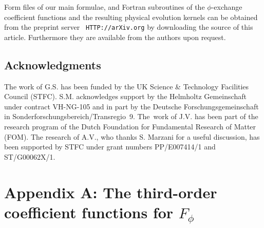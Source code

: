 \documentclass[12pt]{article}
\renewcommand{\theequation}{\thesection.\arabic{equation}}
\begin{document}
{\sc Form} files of our main formulae, and {\sc Fortran} subroutines of the
$\phi$-exchange coefficient functions and the resulting physical evolution 
kernels can be obtained from the preprint server \ {\tt HTTP://arXiv.org} by 
downloading the source of this article. Furthermore they are available from the
authors upon request.
%
%
\vspace*{\fill}
\subsection*{Acknowledgments}
%
The work of G.S. has been funded by the UK Science \& Technology Facilities 
Council (STFC). 
S.M. acknowledges support by the Helmholtz Gemeinschaft under contract 
VH-NG-105 and in part by the Deutsche Forschungsgemeinschaft in 
Sonderforschungs\-be\-reich/Transregio~9. 
The~work of J.V. has been part of the research program of the Dutch Foundation 
for Fundamental Research of Matter (FOM). 
The research of A.V., who thanks S. Marzani for a useful discussion, has been 
supported by STFC under grant numbers PP/E007414/1 and ST/G00062X/1.

\newpage
%
%
\renewcommand{\theequation}{A.\arabic{equation}}
\setcounter{equation}{0}
\section*{Appendix A: The third-order coefficient functions for \boldmath
 $F_\phi$}
\label{sec:AppA}
%
\setlength{\baselineskip}{0.546cm}
\end{document}
